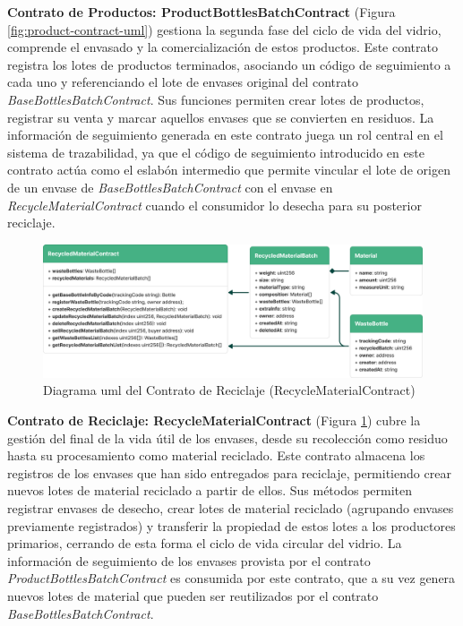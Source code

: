\textbf{Contrato de Productos: ProductBottlesBatchContract} (Figura \ref{fig:product-contract-uml})
 gestiona la segunda fase del ciclo de vida del vidrio, comprende el envasado y la comercialización de estos productos. Este contrato registra los lotes de productos terminados, asociando un código de seguimiento a cada uno y referenciando el lote de envases original del contrato \textit{BaseBottlesBatchContract}. Sus funciones permiten crear lotes de productos, registrar su venta y marcar aquellos envases que se convierten en residuos. La información de seguimiento generada en este contrato juega un rol central en el sistema de trazabilidad, ya que el código de seguimiento introducido en este contrato actúa como el eslabón intermedio que permite vincular el lote de origen de un envase de \textit{BaseBottlesBatchContract} con el envase en \textit{RecycleMaterialContract} cuando el consumidor lo desecha para su posterior reciclaje.

\begin{figure}[!b]
    \centering
    \includegraphics[width=\linewidth]{Figures/uml-recycling-contract.png}
    \caption{Diagrama \acrshort{uml} del Contrato de Reciclaje (RecycleMaterialContract)}
    \label{fig:recycling-contract-uml}
\end{figure}

\textbf{Contrato de Reciclaje: RecycleMaterialContract} (Figura \ref{fig:recycling-contract-uml})
 cubre la gestión del final de la vida útil de los envases, desde su recolección como residuo hasta su procesamiento como material reciclado. Este contrato almacena los registros de los envases que han sido entregados para reciclaje, permitiendo crear nuevos lotes de material reciclado a partir de ellos. Sus métodos permiten registrar envases de desecho, crear lotes de material reciclado (agrupando envases previamente registrados) y transferir la propiedad de estos lotes a los productores primarios, cerrando de esta forma el ciclo de vida circular del vidrio. La información de seguimiento de los envases provista por el contrato \textit{ProductBottlesBatchContract} es consumida por este contrato, que a su vez genera nuevos lotes de material que pueden ser reutilizados por el contrato \textit{BaseBottlesBatchContract}.

